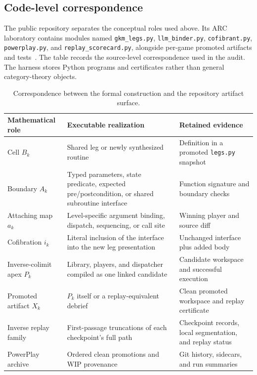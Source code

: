 \documentclass[11pt]{article}
\theoremstyle{definition}
\theoremstyle{remark}
\begin{document}
\subsection{Code-level correspondence}
The public repository separates the conceptual roles used above. Its ARC laboratory
contains modules named \texttt{gkm\_legs.py}, \texttt{llm\_binder.py},
\texttt{cofibrant.py}, \texttt{powerplay.py}, and \texttt{replay\_scorecard.py},
alongside per-game promoted artifacts and tests~\cite{gkmrepo}. The table records the source-level correspondence used in the audit. The harness
stores Python programs and certificates rather than general category-theory objects.

\begin{table}[H]
\centering
\small
\begin{tabularx}{\textwidth}{@{}>{\raggedright\arraybackslash}p{}>{\raggedright\arraybackslash}X>{\raggedright\arraybackslash}X@{}}
\toprule
Mathematical role & Executable realization & Retained evidence \\
\midrule
Cell $B_k$ & Shared leg or newly synthesized routine & Definition in a promoted \texttt{legs.py} snapshot \\
Boundary $A_k$ & Typed parameters, state predicate, expected pre/postcondition, or shared subroutine interface & Function signature and boundary checks \\
Attaching map $a_k$ & Level-specific argument binding, dispatch, sequencing, or call site & Winning player and source diff \\
Cofibration $i_k$ & Literal inclusion of the interface into the new leg presentation & Unchanged interface plus added body \\
Inverse-colimit apex $P_k$ & Library, players, and dispatcher compiled as one linked candidate & Candidate workspace and successful execution \\
Promoted artifact $X_k$ & $P_k$ itself or a replay-equivalent debrief & Clean promoted workspace and replay certificate \\
Inverse replay family & First-passage truncations of each checkpoint's full path & Checkpoint records, local segmentation, and replay status \\
PowerPlay archive & Ordered clean promotions and WIP provenance & Git history, sidecars, and run summaries \\
\bottomrule
\end{tabularx}
\caption{Correspondence between the formal construction and the repository artifact
surface.}
\label{tab:code-correspondence}
\end{table}
\end{document}
